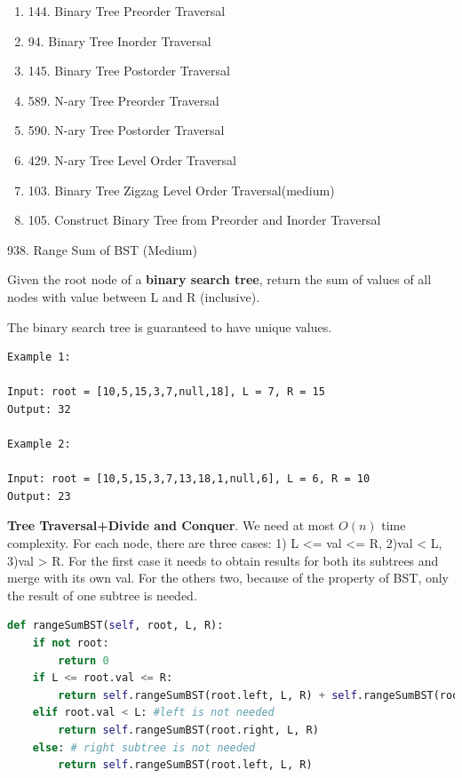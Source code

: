 \documentclass[main.tex]{subfiles}
\begin{document}
\begin{enumerate}
    \item 144. Binary Tree Preorder Traversal
    \item 94. Binary Tree Inorder Traversal
    \item 145. Binary Tree Postorder Traversal
    \item 589. N-ary Tree Preorder Traversal
    \item 590. N-ary Tree Postorder Traversal
    \item 429. N-ary Tree Level Order Traversal
    \item 103. Binary Tree Zigzag Level Order Traversal(medium)
    \item 105. Construct Binary Tree from Preorder and Inorder Traversal
\end{enumerate}

938. Range Sum of BST (Medium)

Given the root node of a \textbf{binary search tree}, return the sum of values of all nodes with value between L and R (inclusive).

The binary search tree is guaranteed to have unique values.
\begin{lstlisting}
Example 1:

Input: root = [10,5,15,3,7,null,18], L = 7, R = 15
Output: 32

Example 2:

Input: root = [10,5,15,3,7,13,18,1,null,6], L = 6, R = 10
Output: 23
\end{lstlisting}
\textbf{Tree Traversal+Divide and Conquer}. We need at most $O(n)$ time complexity. For each node, there are three cases: 1) L <= val <= R, 2)val < L, 3)val > R. For the first case it needs to obtain results for both its subtrees and merge with its own val. For the others two, because of the property of BST, only the result of one subtree is needed. 
\begin{lstlisting}[language=Python]
def rangeSumBST(self, root, L, R):
    if not root:
        return 0
    if L <= root.val <= R:
        return self.rangeSumBST(root.left, L, R) + self.rangeSumBST(root.right, L, R) + root.val
    elif root.val < L: #left is not needed
        return self.rangeSumBST(root.right, L, R)
    else: # right subtree is not needed
        return self.rangeSumBST(root.left, L, R)
\end{lstlisting}
\end{document}

